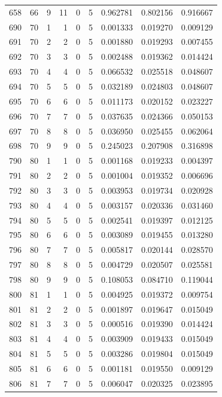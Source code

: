 \begin{longtable}{rrrrrrrrr}
658 & 66 & 9 & 11 & 0 & 5 & 0.962781 & 0.802156 & 0.916667 \\
690 & 70 & 1 & 1 & 0 & 5 & 0.001333 & 0.019270 & 0.009129 \\
691 & 70 & 2 & 2 & 0 & 5 & 0.001880 & 0.019293 & 0.007455 \\
692 & 70 & 3 & 3 & 0 & 5 & 0.002488 & 0.019362 & 0.014424 \\
693 & 70 & 4 & 4 & 0 & 5 & 0.066532 & 0.025518 & 0.048607 \\
694 & 70 & 5 & 5 & 0 & 5 & 0.032189 & 0.024803 & 0.048607 \\
695 & 70 & 6 & 6 & 0 & 5 & 0.011173 & 0.020152 & 0.023227 \\
696 & 70 & 7 & 7 & 0 & 5 & 0.037635 & 0.024366 & 0.050153 \\
697 & 70 & 8 & 8 & 0 & 5 & 0.036950 & 0.025455 & 0.062064 \\
698 & 70 & 9 & 9 & 0 & 5 & 0.245023 & 0.207908 & 0.316898 \\
790 & 80 & 1 & 1 & 0 & 5 & 0.001168 & 0.019233 & 0.004397 \\
791 & 80 & 2 & 2 & 0 & 5 & 0.001004 & 0.019352 & 0.006696 \\
792 & 80 & 3 & 3 & 0 & 5 & 0.003953 & 0.019734 & 0.020928 \\
793 & 80 & 4 & 4 & 0 & 5 & 0.003157 & 0.020336 & 0.031460 \\
794 & 80 & 5 & 5 & 0 & 5 & 0.002541 & 0.019397 & 0.012125 \\
795 & 80 & 6 & 6 & 0 & 5 & 0.003089 & 0.019455 & 0.013280 \\
796 & 80 & 7 & 7 & 0 & 5 & 0.005817 & 0.020144 & 0.028570 \\
797 & 80 & 8 & 8 & 0 & 5 & 0.004729 & 0.020507 & 0.025581 \\
798 & 80 & 9 & 9 & 0 & 5 & 0.108053 & 0.084710 & 0.119044 \\
800 & 81 & 1 & 1 & 0 & 5 & 0.004925 & 0.019372 & 0.009754 \\
801 & 81 & 2 & 2 & 0 & 5 & 0.001897 & 0.019647 & 0.015049 \\
802 & 81 & 3 & 3 & 0 & 5 & 0.000516 & 0.019390 & 0.014424 \\
803 & 81 & 4 & 4 & 0 & 5 & 0.003909 & 0.019433 & 0.015049 \\
804 & 81 & 5 & 5 & 0 & 5 & 0.003286 & 0.019804 & 0.015049 \\
805 & 81 & 6 & 6 & 0 & 5 & 0.001181 & 0.019550 & 0.009129 \\
806 & 81 & 7 & 7 & 0 & 5 & 0.006047 & 0.020325 & 0.023895 \\

\end{longtable}
